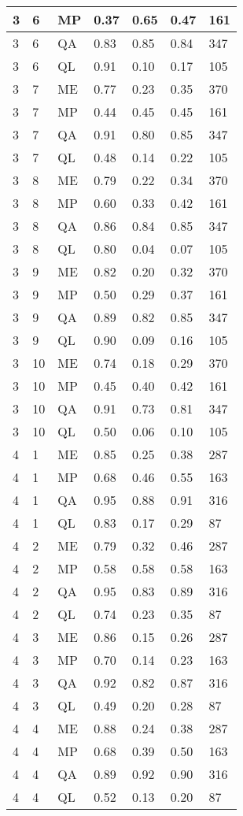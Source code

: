 \begin{table}[!ht]
\begin{tabularx}{300pt}{|X|X|X|X|X|X|X|}
\hline
3&6&MP&0.37&0.65&0.47&161\\
\hline
3&6&QA&0.83&0.85&0.84&347\\
\hline
3&6&QL&0.91&0.10&0.17&105\\
\hline
3&7&ME&0.77&0.23&0.35&370\\
\hline
3&7&MP&0.44&0.45&0.45&161\\
\hline
3&7&QA&0.91&0.80&0.85&347\\
\hline
3&7&QL&0.48&0.14&0.22&105\\
\hline
3&8&ME&0.79&0.22&0.34&370\\
\hline
3&8&MP&0.60&0.33&0.42&161\\
\hline
3&8&QA&0.86&0.84&0.85&347\\
\hline
3&8&QL&0.80&0.04&0.07&105\\
\hline
3&9&ME&0.82&0.20&0.32&370\\
\hline
3&9&MP&0.50&0.29&0.37&161\\
\hline
3&9&QA&0.89&0.82&0.85&347\\
\hline
3&9&QL&0.90&0.09&0.16&105\\
\hline
3&10&ME&0.74&0.18&0.29&370\\
\hline
3&10&MP&0.45&0.40&0.42&161\\
\hline
3&10&QA&0.91&0.73&0.81&347\\
\hline
3&10&QL&0.50&0.06&0.10&105\\
\hline
4&1&ME&0.85&0.25&0.38&287\\
\hline
4&1&MP&0.68&0.46&0.55&163\\
\hline
4&1&QA&0.95&0.88&0.91&316\\
\hline
4&1&QL&0.83&0.17&0.29&87\\
\hline
4&2&ME&0.79&0.32&0.46&287\\
\hline
4&2&MP&0.58&0.58&0.58&163\\
\hline
4&2&QA&0.95&0.83&0.89&316\\
\hline
4&2&QL&0.74&0.23&0.35&87\\
\hline
4&3&ME&0.86&0.15&0.26&287\\
\hline
4&3&MP&0.70&0.14&0.23&163\\
\hline
4&3&QA&0.92&0.82&0.87&316\\
\hline
4&3&QL&0.49&0.20&0.28&87\\
\hline
4&4&ME&0.88&0.24&0.38&287\\
\hline
4&4&MP&0.68&0.39&0.50&163\\
\hline
4&4&QA&0.89&0.92&0.90&316\\
\hline
4&4&QL&0.52&0.13&0.20&87\\

\end{tabularx}
\end{table}
